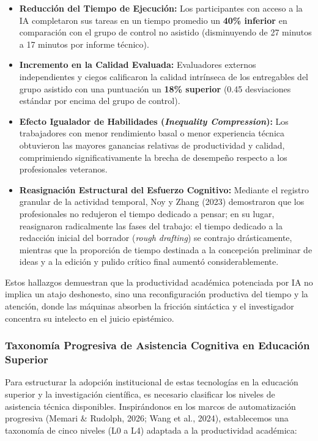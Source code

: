 \begin{itemize}
    \item \textbf{Reducción del Tiempo de Ejecución:} Los participantes con acceso a la IA completaron sus tareas en un tiempo promedio un \textbf{40\% inferior} en comparación con el grupo de control no asistido (disminuyendo de 27 minutos a 17 minutos por informe técnico).
    \item \textbf{Incremento en la Calidad Evaluada:} Evaluadores externos independientes y ciegos calificaron la calidad intrínseca de los entregables del grupo asistido con una puntuación un \textbf{18\% superior} (0.45 desviaciones estándar por encima del grupo de control).
    \item \textbf{Efecto Igualador de Habilidades (\textit{Inequality Compression}):} Los trabajadores con menor rendimiento basal o menor experiencia técnica obtuvieron las mayores ganancias relativas de productividad y calidad, comprimiendo significativamente la brecha de desempeño respecto a los profesionales veteranos.
    \item \textbf{Reasignación Estructural del Esfuerzo Cognitivo:} Mediante el registro granular de la actividad temporal, Noy y Zhang (2023) demostraron que los profesionales no redujeron el tiempo dedicado a pensar; en su lugar, reasignaron radicalmente las fases del trabajo: el tiempo dedicado a la redacción inicial del borrador (\textit{rough drafting}) se contrajo drásticamente, mientras que la proporción de tiempo destinada a la concepción preliminar de ideas y a la edición y pulido crítico final aumentó considerablemente.
\end{itemize}

Estos hallazgos demuestran que la productividad académica potenciada por IA no implica un atajo deshonesto, sino una reconfiguración productiva del tiempo y la atención, donde las máquinas absorben la fricción sintáctica y el investigador concentra su intelecto en el juicio epistémico.

\subsubsection{Taxonomía Progresiva de Asistencia Cognitiva en Educación Superior}

Para estructurar la adopción institucional de estas tecnologías en la educación superior y la investigación científica, es necesario clasificar los niveles de asistencia técnica disponibles. Inspirándonos en los marcos de automatización progresiva (Memari \& Rudolph, 2026; Wang et al., 2024), establecemos una taxonomía de cinco niveles (L0 a L4) adaptada a la productividad académica:

